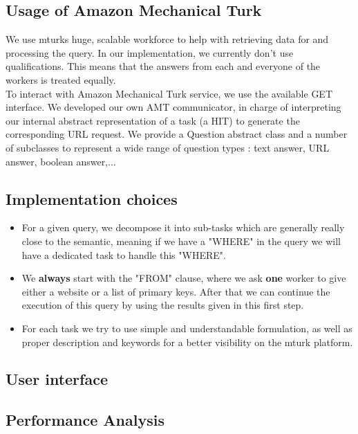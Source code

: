 \documentclass{article}
\begin{document}
\subsection{Usage of Amazon Mechanical Turk}
We use mturks huge, scalable workforce to help with retrieving data for and processing the query. In our implementation, we currently don't use qualifications. This means that the answers from each and everyone of the workers is treated equally.\\
To interact with Amazon Mechanical Turk service, we use the available GET interface. We developed our own AMT communicator, in charge of interpreting our internal abstract representation of a task (a HIT) to generate the corresponding URL request. We provide a Question abstract class and a number of subclasses to represent a wide range of question types : text answer, URL answer, boolean answer,...
\subsection{Implementation choices}
\begin{itemize}
\item For a given query, we decompose it into sub-tasks which are generally really close to the semantic, meaning if we have a "WHERE" in the query we will have a dedicated task to handle this "WHERE".
\item We \textbf{always} start with the "FROM" clause, where we ask \textbf{one} worker to give either a website or a list of primary keys. After that we can continue the execution of this query by using the results given in this first step.
\item For each task we try to use simple and understandable formulation, as well as proper description and keywords for a better visibility on the mturk platform. 

\end{itemize}

\subsection{User interface}
\subsection{Performance Analysis}
\end{document}
